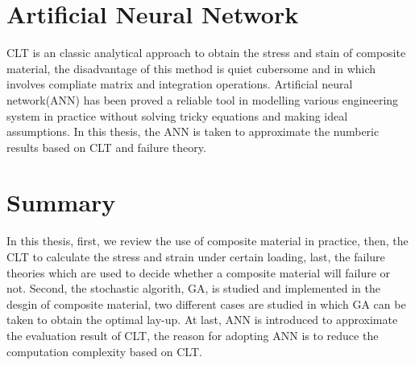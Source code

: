 \section{Artificial Neural Network}
CLT is an classic analytical approach to obtain the stress and stain of
composite material, the disadvantage of this method is quiet cubersome and in
which involves compliate matrix and integration operations. Artificial neural
network(ANN) has been proved a reliable tool in modelling various engineering
system in practice without solving tricky equations and making ideal
assumptions. In this thesis, the ANN is taken to approximate the numberic
results based on CLT and failure theory.

\section{Summary}
In this thesis, first, we review the use of composite material in practice,
then, the CLT to calculate the stress and strain under certain loading, last,
the failure theories which are used to decide whether a composite material will
failure or not. Second, the stochastic algorith, GA, is studied and implemented
in the desgin of composite material, two different cases are studied in which GA
can be taken to obtain the optimal lay-up. At last, ANN is introduced to
approximate the evaluation result of CLT, the reason for adopting ANN is to
reduce the computation complexity based on CLT.




